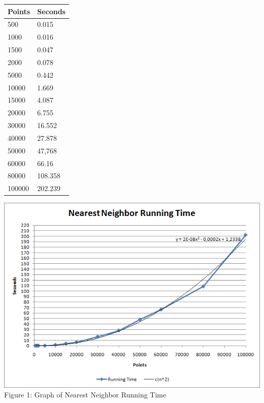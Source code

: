     \begin{tabular}{p{2.5cm}|p{2.5cm}}
        \hline
        Points & Seconds\\
        \hline
        \hline
        500 & 0.015\\
        \hline
        1000 & 0.016\\
        \hline
        1500 & 0.047\\
        \hline
        2000 & 0.078\\
        \hline
        5000 & 0.442\\
        \hline
        10000 & 1.669\\
        \hline
        15000 & 4.087\\
        \hline
        20000 & 6.755\\
        \hline
        30000 & 16.552\\
        \hline
        40000 & 27.878\\
        \hline
        50000 & 47,768\\
        \hline
        60000 & 66.16\\
        \hline
        80000 & 108.358\\
        \hline
        100000 & 202.239\\
        \hline
    \end{tabular}

    \begin{center}
    \includegraphics[scale = 0.6]{1NearestNeighbor/nnRuntimegraph.png}\\
    Figure 1: Graph of Nearest Neighbor Running Time
    \end{center}

